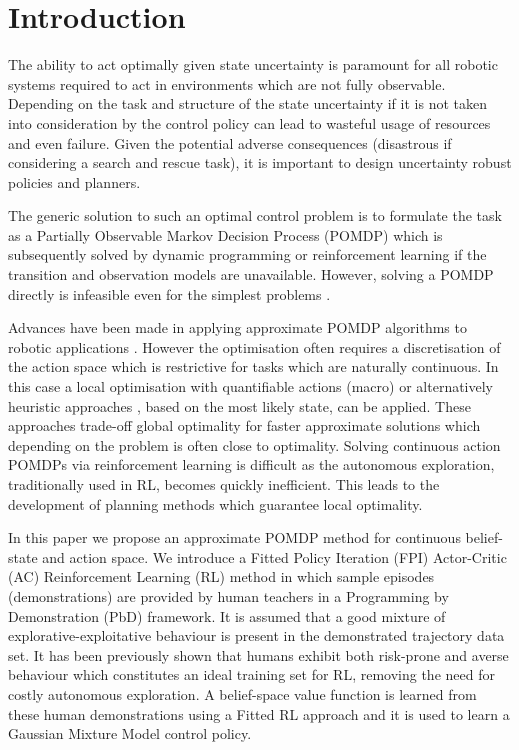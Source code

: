 \documentclass[final,5p,times,twocolumn]{elsarticle}
\begin{document}
\section{Introduction}

The ability to act optimally given state uncertainty is paramount for all robotic systems required 
to act in environments which are not fully observable. Depending on the task and structure of the state
uncertainty if it is not taken into consideration by the control policy can lead to wasteful usage of resources 
and even failure. Given the potential adverse consequences (disastrous if considering a search and rescue task), 
it is important to design uncertainty robust policies and planners.

The generic solution to such an optimal control problem is to formulate the task as a
Partially Observable Markov Decision Process (POMDP) which is subsequently solved by dynamic programming
or reinforcement learning if the transition and observation models are unavailable. 
However, solving a POMDP directly is infeasible even for the simplest problems \cite{PBVI}. 

Advances have been made in applying approximate POMDP algorithms to robotic applications
\cite{pomdp_peg_icra_2014}. However the optimisation often requires a discretisation of the 
action space which is restrictive for tasks which are naturally continuous. In this case
a local optimisation with quantifiable actions (macro) \cite{toussain_2015} or alternatively heuristic 
approaches \cite{Lauri2016}, based on the most likely state, can be applied. 
These approaches trade-off global optimality for faster approximate solutions which depending on 
the problem is often close to optimality. Solving continuous action POMDPs via reinforcement learning 
is difficult as the autonomous exploration, traditionally used in RL, becomes quickly inefficient. 
This leads to the development of planning methods which guarantee local optimality. 

In this paper we propose an approximate POMDP method for continuous belief-state and action space. We introduce a 
Fitted Policy Iteration (FPI) Actor-Critic (AC) Reinforcement Learning (RL) method in which sample episodes (demonstrations)
are provided by human teachers in a Programming by Demonstration (PbD) framework. It is assumed that 
a good mixture of explorative-exploitative behaviour is present in the demonstrated trajectory data set.
It has been previously shown \cite{Chambrier2014} that humans exhibit both risk-prone and averse behaviour which constitutes an ideal training set for RL, 
removing the need for costly autonomous exploration. A belief-space value function is learned from these 
human demonstrations using a Fitted RL approach and it is used to learn a Gaussian Mixture Model control policy.
\end{document}

